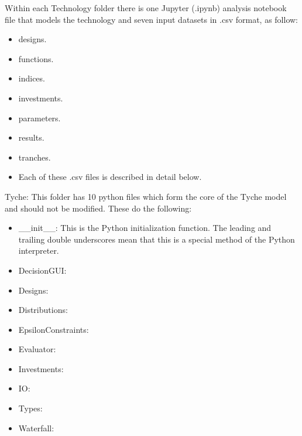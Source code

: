\documentclass[letterpaper,10pt,english]{sphinxmanual}
\begin{document}
Within each Technology folder there is one Jupyter (.ipynb) analysis notebook file that models the technology and seven input datasets in .csv format, as follow:
\begin{itemize}
\item {} 
designs.

\item {} 
functions.

\item {} 
indices.

\item {} 
investments.

\item {} 
parameters.

\item {} 
results.

\item {} 
tranches.

\item {} 
Each of these .csv files is described in detail below.

\end{itemize}

Tyche: This folder has 10 python files which form the core of the Tyche model and should not be modified.  These do the following:
\begin{itemize}
\item {} 
\_\_init\_\_: This is the Python initialization function.   The leading and trailing double underscores mean that this is a special method of the Python interpreter.

\item {} 
DecisionGUI:

\item {} 
Designs:

\item {} 
Distributions:

\item {} 
EpsilonConstraints:

\item {} 
Evaluator:

\item {} 
Investments:

\item {} 
IO:

\item {} 
Types:

\item {} 
Waterfall:

\end{itemize}
\end{document}
